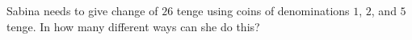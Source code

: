 Sabina needs to give change of $26$ tenge using coins of denominations $1$, $2$, and $5$ tenge. In how many different ways can she do this?

